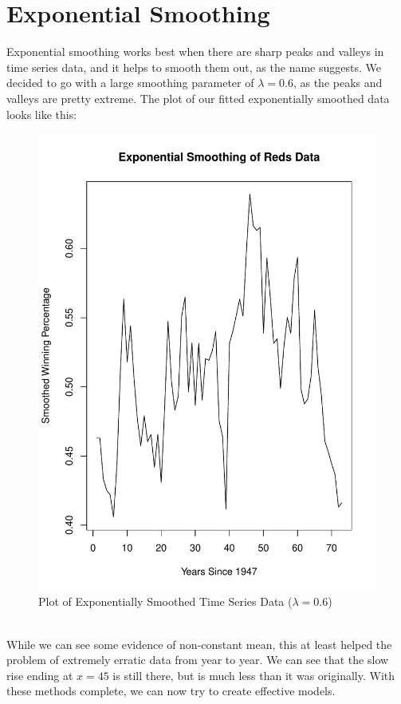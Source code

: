 \documentclass[12pt]{article}
\begin{document}
\section{Exponential Smoothing}\label{sec:chapter}
Exponential smoothing works best when there are sharp peaks and valleys in time series data, and it helps to smooth them out, as the name suggests. We decided to go with a large smoothing parameter of \(\lambda = 0.6\), as the peaks and valleys are pretty extreme. The plot of our fitted exponentially smoothed data looks like this:\\
\begin{figure}[h!]
\centering
\includegraphics[scale=0.6]{ES plot.pdf}
\caption{Plot of Exponentially Smoothed Time Series Data (\(\lambda = 0.6\))}
\label{fig:Figure 3}
\end{figure}\\
While we can see some evidence of non-constant mean, this at least helped the problem of extremely erratic data from year to year. We can see that the slow rise ending at \(x = 45\) is still there, but is much less than it was originally. With these methods complete, we can now try to create effective models.\\
\end{document}
